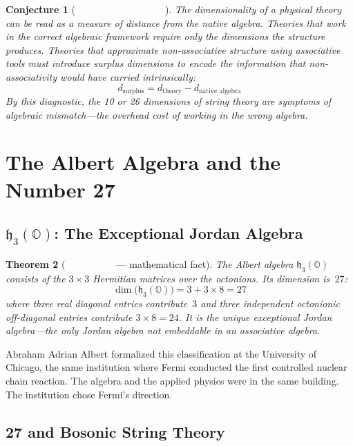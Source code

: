 \documentclass[11pt,letterpaper]{article}
\newcommand{\proved}{\texorpdfstring{\colorbox{proved}{\textcolor{white}{\scriptsize\textbf{\,PROVED\,}}}}{ [PROVED]}}
\newcommand{\conjectured}{\texorpdfstring{\colorbox{conjectured}{\textcolor{white}{\scriptsize\textbf{\,CONJECTURED\,}}}}{ [CONJECTURED]}}
\newtheorem{theorem}{Theorem}[section]
\newtheorem{conjecture}[theorem]{Conjecture}
\newcommand{\OO}{\mathbb{O}}
\newcommand{\hthreeO}{\mathfrak{h}_3(\OO)}
\begin{document}
\begin{conjecture}[\conjectured]
The dimensionality of a physical theory can be read as a \emph{measure of distance from the native algebra}. Theories that work in the correct algebraic framework require only the dimensions the structure produces. Theories that approximate non-associative structure using associative tools must introduce surplus dimensions to encode the information that non-associativity would have carried intrinsically:
\[
  d_{\text{surplus}} = d_{\text{theory}} - d_{\text{native algebra}}
\]
By this diagnostic, the 10 or 26 dimensions of string theory are symptoms of algebraic mismatch---the overhead cost of working in the wrong algebra.
\end{conjecture}


\section{The Albert Algebra and the Number 27}

\subsection{\texorpdfstring{$\hthreeO$}{h3(O)}: The Exceptional Jordan Algebra}

\begin{theorem}[\proved --- mathematical fact]\label{thm:albert}
The Albert algebra $\hthreeO$ consists of the $3\times 3$ Hermitian matrices over the octonions. Its dimension is~$27$:
\[
  \dim\bigl(\hthreeO\bigr) = 3 + 3 \times 8 = 27
\]
where three real diagonal entries contribute~$3$ and three independent octonionic off-diagonal entries contribute $3 \times 8 = 24$. It is the unique \emph{exceptional} Jordan algebra---the only Jordan algebra not embeddable in an associative algebra.
\end{theorem}

Abraham Adrian Albert formalized this classification at the University of Chicago, the same institution where Fermi conducted the first controlled nuclear chain reaction. The algebra and the applied physics were in the same building. The institution chose Fermi's direction.

\subsection{27 and Bosonic String Theory}
\end{document}
